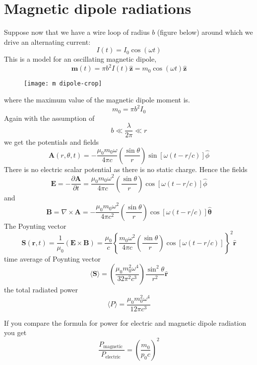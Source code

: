  \section{Magnetic dipole radiations}
 Suppose now that we have a wire loop of radius $b$ (figure below) around which we drive an alternating current:
 $$I(t)=I_{0} \cos (\omega t)$$
 This is a model for an oscillating magnetic dipole,
 $$
 \mathbf{m}(t)=\pi b^{2} I(t) \hat{\mathbf{z}}=m_{0} \cos (\omega t) \hat{\mathbf{z}}
 $$
 \begin{figure}[H]
 	\centering
 	\texttt{[image: m dipole-crop]}
 	\caption{}
 	\label{}
 \end{figure}
 where the maximum value of the magnetic dipole moment is.\\
 $$m_{0}=\pi b^{2} I_{0}$$
 Again with the assumption of
 $$
 b \ll \frac{\lambda}{2 \pi} \ll r
 $$
 we get the potentials and fields \\
 $$\mathbf{A}(r, \theta, t)=-\frac{\mu_{0} m_{0} \omega}{4 \pi c}\left(\frac{\sin \theta}{r}\right) \sin [\omega(t-r / c)] \hat{\phi}$$
 There is no electric scalar potential as there is no static charge. Hence the fields\\
 $$\mathbf{E}=-\frac{\partial \mathbf{A}}{\partial t}=\frac{\mu_{0} m_{0} \omega^{2}}{4 \pi c}\left(\frac{\sin \theta}{r}\right) \cos [\omega(t-r / c)] \hat{\phi}$$
 and
 $$\mathbf{B}=\nabla \times \mathbf{A}=-\frac{\mu_{0} m_{0} \omega^{2}}{4 \pi c^{2}}\left(\frac{\sin \theta}{r}\right) \cos [\omega(t-r / c)] \hat{\boldsymbol{\theta}}$$
 The Poynting vector 
 $$\mathbf{S}(\mathbf{r}, t)=\frac{1}{\mu_{0}}(\mathbf{E} \times \mathbf{B})=\frac{\mu_{0}}{c}\left\{\frac{m_{0} \omega^{2}}{4 \pi c}\left(\frac{\sin \theta}{r}\right) \cos [\omega(t-r / c)]\right\}^{2} \hat{\mathbf{r}}$$
 time average of Poynting vector
 $$
 \langle\mathbf{S}\rangle=\left(\frac{\mu_{0} m_{0}^{2} \omega^{4}}{32 \pi^{2} c^{3}}\right) \frac{\sin ^{2} \theta}{r^{2}} \hat{\mathbf{r}}
 $$
 the total radiated power
 $$
 \langle P\rangle=\frac{\mu_{0} m_{0}^{2} \omega^{4}}{12 \pi c^{3}}
 $$
 \begin{note}
 	If you compare the formula for power for electric and magnetic dipole radiation you get
 	$$\frac{P_{\text {magnetic }}}{P_{\text {electric }}}=\left(\frac{m_{0}}{p_{0} c}\right)^{2}$$
 \end{note}
 

